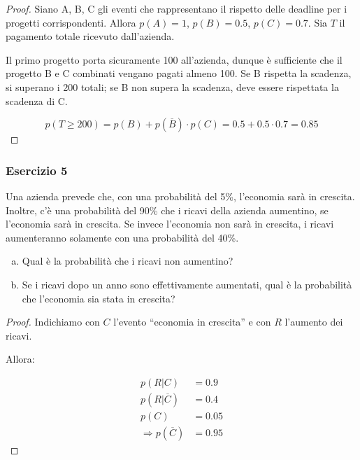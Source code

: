 \documentclass{beamer}
\begin{document}
\begin{frame}[fragile]
	\begin{proof}%
		Siano A, B, C gli eventi che rappresentano il rispetto delle deadline per i progetti corrispondenti. Allora $p(A)=1$, $p(B)=0.5$, $p(C)=0.7$. Sia $T$ il pagamento totale ricevuto dall'azienda.

		\medskip

		Il primo progetto porta sicuramente 100 all'azienda, dunque è sufficiente che il progetto B e C combinati vengano pagati almeno 100. Se B rispetta la scadenza, si superano i 200 totali; se B non supera la scadenza, deve essere rispettata la scadenza di C.

		$$p(T\geq200)=p(B)+p(\overline{B})\cdot p(C)=0.5+0.5\cdot0.7=0.85$$
	\end{proof}
\end{frame}
\begin{frame}[fragile]
	\frametitle{Esercizio 5}

	\begin{exercise}
		Una azienda prevede che, con una probabilità del 5\%, l'economia sarà in crescita. Inoltre, c'è una probabilità del 90\% che i ricavi della azienda aumentino, se l'economia sarà in crescita. Se invece l'economia non sarà in crescita, i ricavi aumenteranno solamente con una probabilità del 40\%.

		\begin{enumerate}[(a)]
			\item Qual è la probabilità che i ricavi non aumentino?
			\item Se i ricavi dopo un anno sono effettivamente aumentati, qual è la probabilità che l'economia sia stata in crescita?
		\end{enumerate}
	\end{exercise}
\end{frame}

\begin{frame}[fragile]
	\begin{proof}\renewcommand{\qedsymbol}{$\longrightarrow$}
		Indichiamo con $C$ l'evento ``economia in crescita'' e con $R$ l'aumento dei ricavi.

		Allora:

		\begin{align*}
			p(R|C) & = 0.9 \\
			p(R|\overline{C}) & = 0.4 \\
			p(C) & = 0.05 \\ \Rightarrow p(\overline{C}) & = 0.95
		\end{align*}
	\end{proof}
\end{frame}
\end{document}
